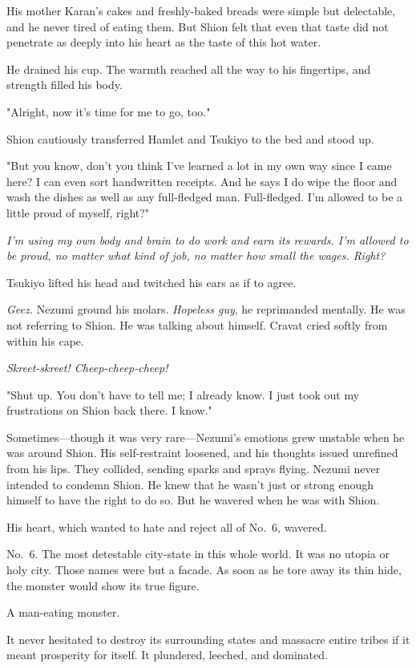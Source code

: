 His mother Karan's cakes and freshly-baked breads were simple but
delectable, and he never tired of eating them. But Shion felt that even
that taste did not penetrate as deeply into his heart as the taste of
this hot water.

He drained his cup. The warmth reached all the way to his
fingertips, and strength filled his body.

"Alright, now it's time for me to go, too."

Shion cautiously transferred Hamlet and Tsukiyo to the bed and stood up.

"But you know, don't you think I've learned a lot in my own way since I
came here? I can even sort handwritten receipts. And he says I do wipe
the floor and wash the dishes as well as any full-fledged man.
Full-fledged. I'm allowed to be a little proud of myself, right?"

\emph{I'm using my own body and brain to do work and earn its rewards. I'm
allowed to be proud, no matter what kind of job, no matter how small the
wages. Right?}

Tsukiyo lifted his head and twitched his ears as if to agree.

\emph{Geez.} Nezumi ground his molars. \emph{Hopeless guy}, he reprimanded mentally.
He was not referring to Shion. He was talking about himself. Cravat
cried softly from within his cape.

\emph{Skreet-skreet! Cheep-cheep-cheep!}

"Shut up. You don't have to tell me; I already know. I just took out my
frustrations on Shion back there. I know."

Sometimes---though it was very rare---Nezumi's emotions grew unstable when
he was around Shion. His self-restraint loosened, and his thoughts
issued unrefined from his lips. They collided, sending sparks and sprays
flying. Nezumi never intended to condemn Shion. He knew that he wasn't
just or strong enough himself to have the right to do so. But he wavered
when he was with Shion.

His heart, which wanted to hate and reject all of No.~6, wavered.

No.~6. The most detestable city-state in this whole world. It was no
utopia or holy city. Those names were but a facade. As soon as he tore
away its thin hide, the monster would show its true figure.

A man-eating monster.

It never hesitated to destroy its surrounding states and massacre entire
tribes if it meant prosperity for itself. It plundered, leeched, and
dominated.

